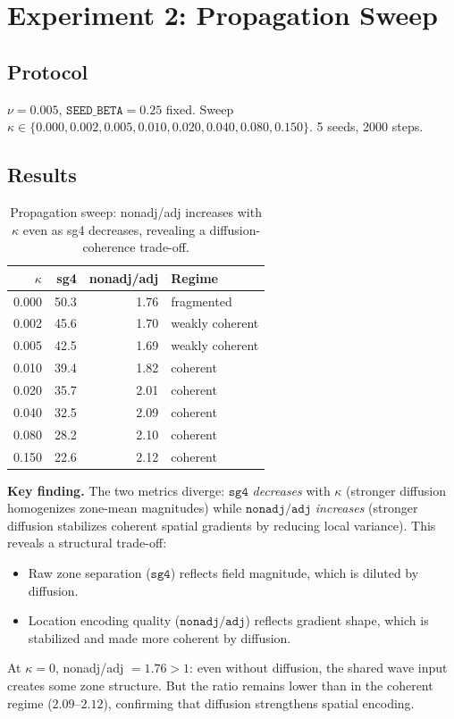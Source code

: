 \documentclass[11pt]{article}
\theoremstyle{remark}
\begin{document}
\section{Experiment 2: Propagation Sweep}

\subsection{Protocol}

$\nu = 0.005$, $\mathtt{SEED\_BETA} = 0.25$ fixed. Sweep $\kappa \in
\{0.000, 0.002, 0.005, 0.010, 0.020, 0.040, 0.080, 0.150\}$.
5 seeds, 2000 steps.

\subsection{Results}

\begin{table}[h]
\centering
\caption{Propagation sweep: nonadj/adj increases with $\kappa$ even as sg4
decreases, revealing a diffusion-coherence trade-off.}
\label{tab:exp2}
\begin{tabular}{rrrl}
\toprule
$\kappa$ & sg4 & nonadj/adj & Regime \\
\midrule
0.000 & 50.3 & 1.76 & fragmented  \\
0.002 & 45.6 & 1.70 & weakly coherent \\
0.005 & 42.5 & 1.69 & weakly coherent \\
0.010 & 39.4 & 1.82 & coherent \\
0.020 & 35.7 & 2.01 & coherent \\
0.040 & 32.5 & 2.09 & coherent \\
0.080 & 28.2 & 2.10 & coherent \\
0.150 & 22.6 & 2.12 & coherent \\
\bottomrule
\end{tabular}
\end{table}

\textbf{Key finding.} The two metrics diverge: $\mathtt{sg4}$ \emph{decreases}
with $\kappa$ (stronger diffusion homogenizes zone-mean magnitudes) while
$\mathtt{nonadj/adj}$ \emph{increases} (stronger diffusion stabilizes coherent
spatial gradients by reducing local variance). This reveals a structural
trade-off:
\begin{itemize}
  \item Raw zone separation ($\mathtt{sg4}$) reflects field magnitude, which is
    diluted by diffusion.
  \item Location encoding quality ($\mathtt{nonadj/adj}$) reflects gradient
    shape, which is stabilized and made more coherent by diffusion.
\end{itemize}
At $\kappa = 0$, nonadj/adj $= 1.76 > 1$: even without diffusion, the shared
wave input creates some zone structure. But the ratio remains lower than in the
coherent regime ($2.09$--$2.12$), confirming that diffusion strengthens spatial
encoding.
\end{document}
